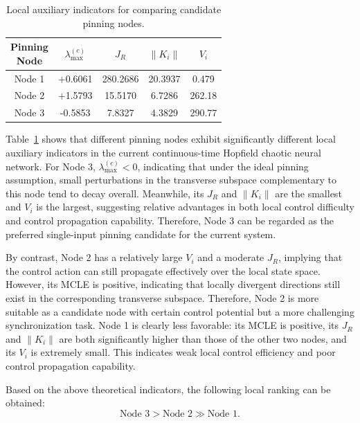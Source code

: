 \documentclass[10pt,twocolumn]{article}
\theoremstyle{definition}
\begin{document}
\begin{table}[htbp]
	\centering
	\setlength{\tabcolsep}{3pt}
	\renewcommand{\arraystretch}{1.12}
	\caption{Local auxiliary indicators for comparing candidate pinning nodes.}
	\label{tab:local_node_metrics}
	\begin{tabular}{@{}ccccc@{}}
		\toprule
		\makecell{Pinning\\Node} 
		& $\lambda_{\max}^{(c)}$ 
		& $J_R$ 
		& $\|K_i\|$ 
		& $V_i$ \\
		\midrule
		Node 1 & +0.6061 & 280.2686 & 20.3937 & 0.479 \\
		Node 2 & +1.5793 & 15.5170 & 6.7286 & 262.18 \\
		Node 3 & -0.5853 & 7.8327 & 4.3829 & 290.77 \\
		\bottomrule
	\end{tabular}
\end{table}

Table~\ref{tab:local_node_metrics} shows that different pinning nodes exhibit significantly different local auxiliary indicators in the current continuous-time Hopfield chaotic neural network. For Node 3, $\lambda_{\max}^{(c)}<0$, indicating that under the ideal pinning assumption, small perturbations in the transverse subspace complementary to this node tend to decay overall. Meanwhile, its $J_R$ and $\|K_i\|$ are the smallest and $V_i$ is the largest, suggesting relative advantages in both local control difficulty and control propagation capability. Therefore, Node 3 can be regarded as the preferred single-input pinning candidate for the current system.

By contrast, Node 2 has a relatively large $V_i$ and a moderate $J_R$, implying that the control action can still propagate effectively over the local state space. However, its MCLE is positive, indicating that locally divergent directions still exist in the corresponding transverse subspace. Therefore, Node 2 is more suitable as a candidate node with certain control potential but a more challenging synchronization task. Node 1 is clearly less favorable: its MCLE is positive, its $J_R$ and $\|K_i\|$ are both significantly higher than those of the other two nodes, and its $V_i$ is extremely small. This indicates weak local control efficiency and poor control propagation capability.

Based on the above theoretical indicators, the following local ranking can be obtained:
\begin{equation}
	\text{Node 3}
	>
	\text{Node 2}
	\gg
	\text{Node 1}.
	\label{eq:node_ranking}
\end{equation}
\end{document}
